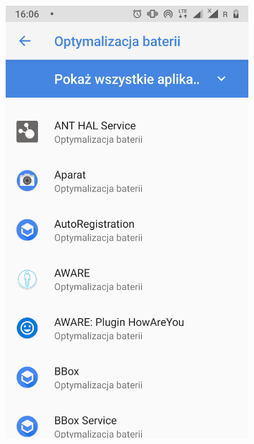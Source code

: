 \begin{enumerate}
	\begin{figure}[H]
		\centering
		\begin{subfigure}{0.35\textwidth}
			\centering
			\includegraphics[scale=0.13]{dodatekA/3_9.png}
			\subcaption{\label{subfigure_a}}
		\end{subfigure}
		\begin{subfigure}{0.35\textwidth}
			\centering

\end{subfigure}
\end{figure}
\end{enumerate}
